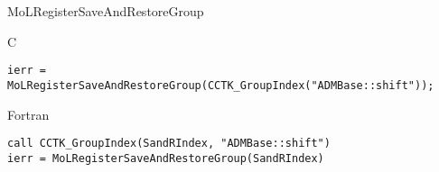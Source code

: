 \begin{FunctionDescription}{MoLRegisterSaveAndRestoreGroup}
  \begin{ExampleSection}
    \begin{Example}{C}
\begin{verbatim}
ierr = MoLRegisterSaveAndRestoreGroup(CCTK_GroupIndex("ADMBase::shift"));
\end{verbatim}
    \end{Example}
    \begin{Example}{Fortran}
\begin{verbatim}
call CCTK_GroupIndex(SandRIndex, "ADMBase::shift")
ierr = MoLRegisterSaveAndRestoreGroup(SandRIndex)
\end{verbatim}
    \end{Example}
  \end{ExampleSection}

\end{FunctionDescription}



